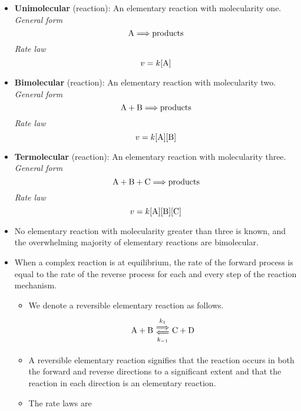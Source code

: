 \documentclass[../notes.tex]{subfiles}
\begin{document}
\begin{itemize}
    \item \textbf{Unimolecular} (reaction): An elementary reaction with molecularity one. \emph{General form}
    \begin{equation*}
        \ce{A} \Longrightarrow \text{products}
    \end{equation*}
    \emph{Rate law}
    \begin{equation*}
        v = k[\ce{A}]
    \end{equation*}
    \item \textbf{Bimolecular} (reaction): An elementary reaction with molecularity two. \emph{General form}
    \begin{equation*}
        \ce{A}+\ce{B} \Longrightarrow \text{products}
    \end{equation*}
    \emph{Rate law}
    \begin{equation*}
        v = k[\ce{A}][\ce{B}]
    \end{equation*}
    \item \textbf{Termolecular} (reaction): An elementary reaction with molecularity three. \emph{General form}
    \begin{equation*}
        \ce{A}+\ce{B}+\ce{C} \Longrightarrow \text{products}
    \end{equation*}
    \emph{Rate law}
    \begin{equation*}
        v = k[\ce{A}][\ce{B}][\ce{C}]
    \end{equation*}
    \item No elementary reaction with molecularity greater than three is known, and the overwhelming majority of elementary reactions are bimolecular.
    \item When a complex reaction is at equilibrium, the rate of the forward process is equal to the rate of the reverse process for each and every step of the reaction mechanism.
    \begin{itemize}
        \item We denote a reversible elementary reaction as follows.
        \begin{equation*}
            \ce{A + B} \Longleftrightarrows[k_1][k_{-1}] \ce{C + D}
        \end{equation*}
        \item A reversible elementary reaction signifies that the reaction occurs in both the forward and reverse directions to a significant extent and that the reaction in each direction is an elementary reaction.
        \item The rate laws are

\end{itemize}
\end{itemize}
\end{document}
